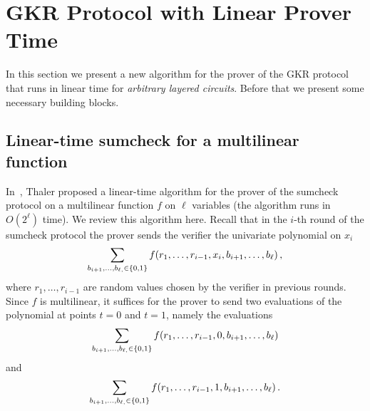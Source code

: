 \section{GKR Protocol with Linear Prover Time}
\label{sec::gkrlin}

In this section we present a new algorithm for the prover of the GKR protocol~\cite{GKR} that runs in linear time for \emph{arbitrary layered circuits}. Before that we present some necessary building blocks.

\subsection{Linear-time sumcheck for a multilinear function~\cite{JT_Thesis}}
In~\cite{JT_Thesis}, Thaler proposed a linear-time algorithm for the prover of the sumcheck protocol on a multilinear function $f$ on $\ell$ variables (the algorithm runs in $O(2^\ell)$ time). We review this algorithm here. Recall that in the $i$-th round of the sumcheck protocol the prover sends the verifier the univariate polynomial on $x_i$ $$\sum_{b_{i+1}, \ldots,b_{\ell, }\in\{0,1\}}f(r_1,\ldots, r_{i-1}, x_{i}, b_{i+1},\ldots, b_{\ell})\, ,$$
where $r_1, \ldots, r_{i-1}$ are random values chosen by the verifier in previous rounds. Since $f$ is multilinear, it suffices for the prover to send two evaluations of the polynomial at points $t = 0$ and $t=1$, namely the evaluations
\begin{equation}\label{0-message}
\sum_{b_{i+1}, \ldots,b_{\ell, }\in\{0,1\}}f(r_1,\ldots, r_{i-1}, 0, b_{i+1},\ldots, b_{\ell})
\end{equation} and  
\begin{equation}\label{1-message}
\sum_{b_{i+1}, \ldots,b_{\ell, }\in\{0,1\}}f(r_1,\ldots, r_{i-1}, 1, b_{i+1},\ldots, b_{\ell})\,.
\end{equation}



